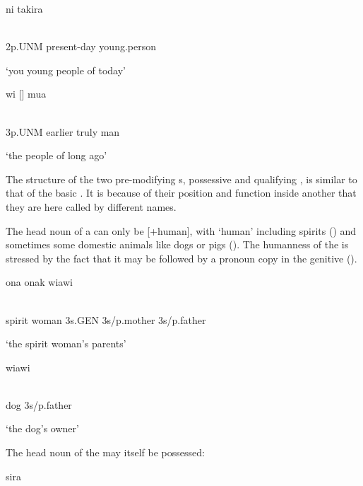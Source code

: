 \ea%
\label{ex:x401}
\gll ni    takira \\
      \\
\glt
\z

2p.UNM  present-day  young.person

`you young people of today'

\ea%
\label{ex:x1883}
\gll wi  []  mua \\
      \\
\glt
\z

3p.UNM  earlier  truly  man

`the people of long ago'

The structure of the two pre-modifying s, possessive  and qualifying , is similar to that of the basic . It is because of their position and function inside another  that they are here called by different names.

The head noun of a  can only be [+human], with `human' including spirits () and sometimes some domestic animals like dogs or pigs (). The humanness of the  is stressed by the fact that it may be followed by a pronoun copy in the genitive ().

\ea%
\label{ex:x402}
\gll {} ona  onak  wiawi \\
      \\
\glt
\z

spirit  woman  3s.GEN  3s/p.mother  3s/p.father

`the spirit woman's parents'

\ea%
\label{ex:x403}
\gll {}  wiawi \\
      \\
\glt
\z

dog  3s/p.father

`the dog's owner'

The head noun of the  may itself be possessed:

\ea%
\label{ex:x404}
\gll {}  sira \\
      \\
\glt
\z

